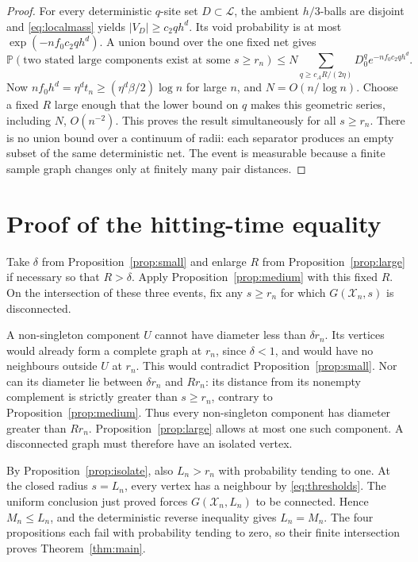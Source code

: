 \documentclass[11pt]{article}
\theoremstyle{remark}
\newcommand{\Pp}{\mathbb P}
\begin{document}
\begin{proof}
For every deterministic $q$-site set $D\subset\mathcal L$, the ambient
$h/3$-balls are disjoint and \eqref{eq:localmass} yields
$|V_D|\geq c_2qh^d$. Its void probability is at most
$\exp(-nf_0c_2qh^d)$. A union bound over the one fixed net gives
\begin{equation}\label{eq:largevoid}
 \Pp(\text{two stated large components exist at some }s\geq r_n)
 \leq N\sum_{q\geq c_AR/(2\eta)}D_0^q e^{-nf_0c_2qh^d}.
\end{equation}
Now $nf_0h^d=\eta^dt_n\geq(\eta^d\beta/2)\log n$ for large $n$, and
$N=O(n/\log n)$. Choose a fixed $R$ large enough that the lower bound on
$q$ makes this geometric series, including $N$, $O(n^{-2})$.
This proves the result simultaneously for all $s\geq r_n$.
There is no union bound over a continuum of radii: each separator produces
an empty subset of the same deterministic net. The event is measurable
because a finite sample graph changes only at finitely many pair distances.
\end{proof}

\section{Proof of the hitting-time equality}
Take $\delta$ from Proposition~\ref{prop:small} and enlarge $R$ from
Proposition~\ref{prop:large} if necessary so that $R>\delta$.
Apply Proposition~\ref{prop:medium} with this fixed $R$.
On the intersection of these three events, fix any $s\geq r_n$ for which
$G(\mathcal X_n,s)$ is disconnected.

A non-singleton component $U$ cannot have diameter less than $\delta r_n$.
Its vertices would already form a complete graph at $r_n$, since $\delta<1$,
and would have no neighbours outside $U$ at $r_n$. This would contradict
Proposition~\ref{prop:small}. Nor can its diameter lie between $\delta r_n$
and $Rr_n$: its distance from its nonempty complement is strictly greater
than $s\geq r_n$, contrary to Proposition~\ref{prop:medium}.
Thus every non-singleton component has diameter greater than $Rr_n$.
Proposition~\ref{prop:large} allows at most one such component. A disconnected
graph must therefore have an isolated vertex.

By Proposition~\ref{prop:isolate}, also $L_n>r_n$ with probability tending to
one. At the closed radius $s=L_n$, every vertex has a neighbour by
\eqref{eq:thresholds}. The uniform conclusion just proved forces
$G(\mathcal X_n,L_n)$ to be connected. Hence $M_n\leq L_n$, and the
deterministic reverse inequality gives $L_n=M_n$.
The four propositions each fail with probability tending to zero, so their
finite intersection proves Theorem~\ref{thm:main}.
\end{document}
